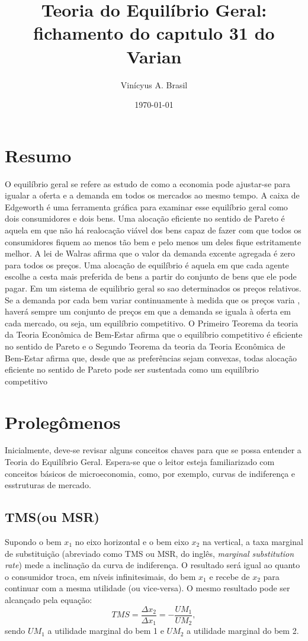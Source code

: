 \documentclass[oneside,12pt, letterpaper]{book}
\title{Teoria do Equil{\'i}brio Geral: fichamento do cap{\i}tulo 31 do Varian}
\date{\today}
\author {Vin{\' i}cyus A. Brasil}
\begin{document}
\maketitle
\chapter*{Resumo}

\thispagestyle{myheadings}
O equil{\'i}brio geral se refere as estudo de como a economia pode ajustar-se para igualar a oferta e a demanda em todos os mercados ao mesmo tempo. A caixa de 
Edgeworth {\'e} uma ferramenta gr{\'a}fica para examinar esse equil{\'i}brio geral como dois consumidores e dois bens. Uma aloca{\c c}{\~a}o eficiente no sentido de
Pareto {\'e} aquela em que n{\~a}o h{\'a} realoca{\c c}{\~a}o vi{\'a}vel dos bens capaz de fazer com que todos os consumidores fiquem ao menos t{\~a}o bem e pelo menos
um deles fique estritamente melhor. A lei de Walras afirma que o valor da demanda excente agregada {\'e} zero para todos os pre{\c c}os. Uma aloca{\c c}{\~a}o de 
equil{\'i}brio {\'e} aquela em que cada agente escolhe a cesta mais preferida de bens a partir do conjunto de bens que ele pode pagar. Em um sistema de equilibrio geral so
sao determinados os pre{\c c}os relativos. Se a demanda por cada bem variar continuamente {\`a} medida que os pre{\c c}os varia , haver{\'a} sempre um conjunto de pre{\c c}os em que a 
demanda se iguala {\`a} oferta em cada mercado, ou seja, um equil{\'i}brio competitivo. O Primeiro Teorema da teoria da Teoria Econ{\^o}mica de Bem-Estar afirma que o equil{\'i}brio competitivo {\'e} eficiente
no sentido de Pareto e o Segundo Teorema da teoria da Teoria Econ{\^o}mica de Bem-Estar  afirma que, desde que as prefer{\^e}ncias sejam convexas, todas aloca{\c c}{\~a}o eficiente no sentido de Pareto pode ser 
sustentada como um equil{\'i}brio competitivo
\newpage

\chapter{Proleg{\^ o}menos} 
\label{direta}

	Inicialmente, deve-se revisar alguns conceitos chaves para que se possa entender a Teoria do Equil{\'i}brio Geral. Espera-se que o leitor esteja familiarizado 
	com conceitos b{\' a}sicos de microeconomia, como, por exemplo, curvas de indiferen{\c c}a e esstruturas de mercado. 
\section{TMS(ou MSR)}
Supondo o bem $ x_1 $ no eixo horizontal e o bem eixo $ x_2 $ na vertical, a taxa marginal de substitui{\c c}{\~ a}o (abreviado como TMS ou MSR, do ingl{\^e}s,\textit{ marginal substitution rate})  mede a inclina{\c c}{\~ a}o da curva 
de indiferen{\c c}a. O resultado ser{\' a} igual ao quanto o consumidor troca, em n{\' i}veis infinitesimais, do bem $ x_1 $ e recebe de $ x_2 $ para continuar com a mesma utilidade (ou vice-versa).
O mesmo resultado pode ser alcan{\c c}ado pela equa{\c c}{\~ a}o: 
\[ TMS =  \frac{\Delta x_2}{\Delta x_1} = - \frac{UM_1}{UM_2}, \] sendo $ UM_1 $ a utilidade marginal do bem 1 e $ UM_2 $ a utilidade marginal do bem 2.
\end{document}
